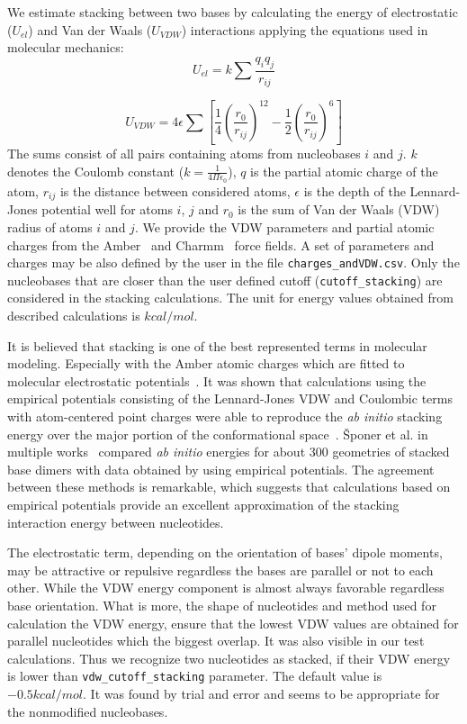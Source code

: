 \documentclass[12pt]{article}
\begin{document}
We estimate stacking between two bases by calculating the energy of electrostatic ($U_{el}$) and Van der Waals ($U_{VDW}$) interactions applying the equations used in molecular mechanics:
\begin{equation}
U_{el} = k \sum{\frac{q_i q_j}{r_{ij}}}
\end{equation}

\begin{equation}
U_{VDW} = 4 \epsilon \sum{ \left[ \frac{1}{4} {\left( \frac{r_0}{r_{ij}} \right) }^{12} - \frac{1}{2} {\left( \frac{r_0}{r_{ij}} \right) }^{6} \right]}
\end{equation}
The sums consist of all pairs containing atoms from nucleobases $i$ and $j$. $k$ denotes the Coulomb constant ($k = \frac{1}{4 \Pi \epsilon_0}$), $q$ is the partial atomic charge of the atom, $r_{ij}$ is the distance between considered atoms, $\epsilon$ is the depth of the Lennard-Jones potential well for atoms $i$, $j$ and $r_0$ is the sum of Van der Waals (VDW) radius of atoms  $i$ and $j$.
We provide the VDW parameters and partial atomic charges from the Amber~\cite{Amber_ff} and Charmm~\cite{Charmm_2000_1, Charmm_2000_2} force fields. A set of parameters and charges may be also defined by the user in the file \texttt{charges\_andVDW.csv}. Only the nucleobases that are closer than the user defined cutoff (\texttt{cutoff\_stacking}) are considered in the stacking calculations. The unit for energy values obtained from described calculations is $kcal/mol$. 

It is believed that stacking is one of the best represented terms in molecular modeling. 
Especially with the Amber atomic charges which are fitted to molecular electrostatic potentials~\cite{Hobza2008a}. It was shown that calculations using the empirical potentials consisting of the Lennard-Jones VDW and Coulombic terms with atom-centered point charges were able to reproduce the {\it ab initio} stacking energy over the major portion of the conformational space~\cite{Leszczynski2002}.
\v{S}poner et al. in multiple works~\cite{Sponer1, Sponer_2, Sponer_3, Sponer_4} compared {\it ab initio} energies for about 300 geometries of stacked base dimers with data obtained by using empirical potentials. The agreement between these methods is remarkable, which suggests that calculations based on empirical potentials provide an excellent approximation of the stacking interaction energy between nucleotides. 


The electrostatic term, depending on the orientation of bases' dipole moments, may be attractive or repulsive regardless the bases are parallel or not to each other. While the VDW energy component is almost always favorable regardless base orientation.
What is more, the shape of nucleotides and method used for calculation the VDW energy, ensure that the lowest VDW values are obtained for parallel nucleotides which the biggest overlap.
It was also visible in our test calculations.
Thus we recognize two nucleotides as stacked, if their VDW energy is lower than \texttt{vdw\_cutoff\_stacking} parameter. 
The default value is $ -0.5 kcal/mol$.
It was found by trial and error and seems to be appropriate for the nonmodified nucleobases.
\end{document}
